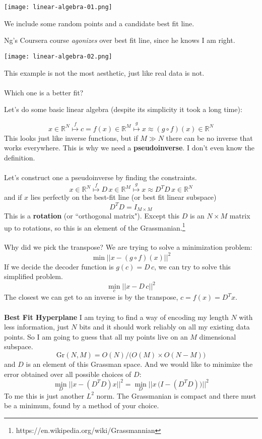 \documentclass[12pt]{article}
\begin{document}
\texttt{[image: linear-algebra-01.png]}

\noindent We include some random points and a candidate best fit line.

\newpage

\noindent Ng's Coursera course \textit{agonizes} over best fit line, since he knows I am right.

\texttt{[image: linear-algebra-02.png]}

\noindent This example is not the most aesthetic, just like real data is not. \\ \\
Which one is a better fit? 

\newpage

\noindent Let's do some basic linear algebra (despite its simplicity it took a long time):

$$ x \in \mathbb{R}^N \stackrel{f}{\mapsto} c = f(x) \in \mathbb{R}^M \stackrel{g}{\mapsto} x \approx (g \circ f)(x) \in \mathbb{R}^N $$
This looks just like inverse functions, but if $M \gg N$ there can be no inverse that works everywhere.  This is why we need a \textbf{pseudoinverse}.  I don't even know the definition. \\ \\
Let's construct one a pseudoinverse by finding the constraints.
$$ x \in \mathbb{R}^N \stackrel{f}{\mapsto} D \, x \in \mathbb{R}^M \stackrel{g}{\mapsto} x \approx D^T D \, x \in \mathbb{R}^N $$
and if $x$ lies perfectly on the best-fit line (or best fit linear subspace)
$$ D^T D = I_{M \times M} $$
This is a \textbf{rotation} (or ``orthogonal matrix").  Except this $D$ is an $N \times M$ matrix up to rotations, so this is an element of the Grassmanian.\footnote{https://en.wikipedia.org/wiki/Grassmannian} \\ \\
Why did we pick the transpose?  We are trying to solve a minimization problem:
$$  \min \big|\big| x - (g \circ f)(x) \big|\big|^2 $$
If we decide the decoder function is $g(c)= D \, c$, we can try to solve this simplified problem. 
$$ \min_c \big|\big| x - D \, c \big|\big|^2 $$
The closest we can get to an inverse is by the transpose, $c = f(x) = D^T x$. \\ \\
{\color{blue!20!green!70!white}\textbf{Best Fit Hyperplane}} I am trying to find a way of encoding my length $N$ with less information, just $N$ bits and it should work reliably on all my existing data points.  So I am going to guess that all my points live on an $M$ dimensional subspace.
$$ \mathrm{Gr}(N,M) = O(N)/\big( O(M) \times O(N-M) \big) $$
and $D$ is an element of this Grassman space.  And we would like to minimize the error obtained over all possible choices of $D$:
$$ \min_D \big|\big| x - (D^T D ) x \big|\big|^2 = 
\min_D \bigg|\bigg| x \, \big(I - (D^T D )\big)  \bigg|\bigg|^2 
$$
To me this is just another $L^2$ norm. The Grassmanian is compact and there must be a minimum, found by a method of your choice.
 
\end{document}
